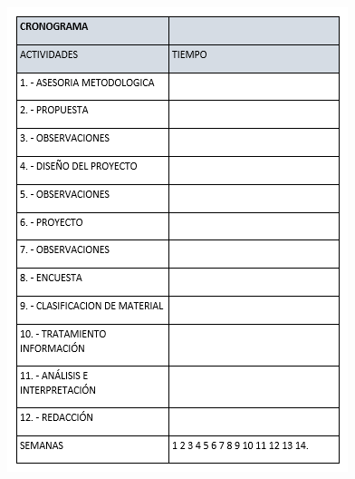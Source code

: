 \documentclass[12pt,letterpaper]{article}
\begin{document}
\begin{center}
\includegraphics[scale=1]{imag11.PNG} 
\end{center}
 
\end{document}
